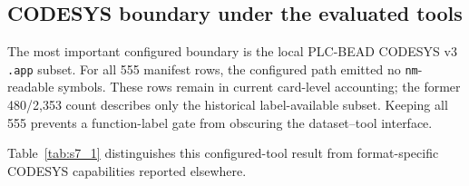 \documentclass[manuscript,screen,review]{acmart}
\begin{document}
\subsection{CODESYS boundary under the evaluated tools}

The most important configured boundary is the local PLC-BEAD CODESYS v3 \texttt{.app} subset. For all 555 manifest rows, the configured path emitted no \texttt{nm}-readable symbols. These rows remain in current card-level accounting; the former 480/2{,}353 count describes only the historical label-available subset. Keeping all 555 prevents a function-label gate from obscuring the dataset--tool interface.

Table~\ref{tab:s7_1} distinguishes this configured-tool result from format-specific CODESYS capabilities reported elsewhere.
\end{document}
